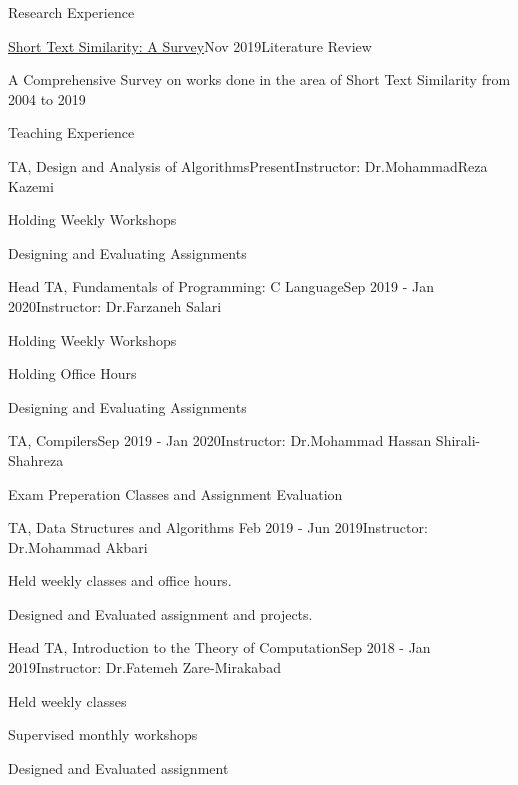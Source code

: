 \documentclass{resume} %
\begin{document}
	\begin{rSection}{Research Experience}
		
			\begin{rSubsection}{\href{https://www.researchgate.net/publication/337632914_Short_Text_Similarity_A_Survey}{\textcolor{coolblack}{Short Text Similarity: A Survey}}}{Nov 2019}{Literature Review}{ }
		\item A Comprehensive Survey on works done in the area of Short Text Similarity from 2004 to 2019
	\end{rSubsection}
	\end{rSection}
	\begin{rSection}{Teaching Experience}
		\begin{rSubsection}{TA, Design and Analysis of Algorithms}{Present}{Instructor: Dr.MohammadReza Kazemi}{ }
		\item Holding Weekly Workshops
		\item Designing and Evaluating Assignments
		\end{rSubsection}				
		\begin{rSubsection}{Head TA, Fundamentals of Programming: C Language}{Sep 2019 - Jan 2020}{Instructor: Dr.Farzaneh Salari}{ }
		\item Holding Weekly Workshops
		\item Holding Office Hours
		\item Designing and Evaluating Assignments
		
		\end{rSubsection}					%
		\begin{rSubsection}{TA, Compilers}{Sep 2019 - Jan 2020}{Instructor: Dr.Mohammad Hassan Shirali-Shahreza}{ }
		\item Exam Preperation Classes and Assignment Evaluation
		\end{rSubsection}					%
		\begin{rSubsection}{TA, Data Structures and Algorithms }{Feb 2019 - Jun 2019}{Instructor: Dr.Mohammad Akbari}{ }
			\item 
			Held weekly classes and office hours.
			\item 
			Designed and Evaluated assignment and projects.\\
		\end{rSubsection}
		\begin{rSubsection}{Head TA, Introduction to the Theory of Computation}{Sep 2018 - Jan 2019}{Instructor: Dr.Fatemeh Zare-Mirakabad}{ }
			\item Held weekly classes 
			\item Supervised monthly workshops
			\item Designed and Evaluated assignment 		
		\end{rSubsection}
		
	\end{rSection}
\end{document}
